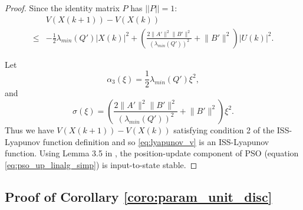 \documentclass{sig-alternate}
\begin{document}
\begin{proof}
Since the identity matrix $ P $ has $ || P || = 1 $:
\begin{equation}
\label{eq:lyapunov_delta5}
\begin{aligned}
& V( X(k+1) ) - V( X(k) ) \\
	\leq & - \frac{1}{2} \lambda_{min}(Q') | X(k) |^{2} + \left( \frac{2 \lVert A' \rVert^{2} \lVert B' \rVert^{2}}{ ( \lambda_{min}(Q') )^{2} } + \lVert B' \rVert^{2} \right) | U(k) |^{2}.
\end{aligned}
\end{equation}
		
Let
\begin{equation}
\nonumber
\alpha_{3} ( \xi )= \frac{1}{2} \lambda_{min}(Q') \xi^{2} ,
\end{equation}
and
\begin{equation}
\nonumber
\sigma ( \xi ) = \left( \frac{2 \lVert A' \rVert^{2} \lVert B' \rVert^{2}}{ ( \lambda_{min}(Q') )^{2} } +  \lVert B' \rVert^{2} \right) \xi^{2} .
\end{equation} 
Thus we have $  V( X(k+1) ) - V( X(k) ) $ satisfying condition 2 of the ISS-Lyapunov function definition and
so \eqref{eq:lyapunov_v} is an ISS-Lyapunov function.
Using Lemma 3.5 in \cite{Jiang2001857}, the position-update component of PSO (equation \eqref{eq:pso_up_linalg_simp}) is input-to-state stable.
\end{proof}

\subsection{Proof of Corollary \ref{coro:param_unit_disc}}
\label{sec:coro:param_unit_disc:proof}
\end{document}
